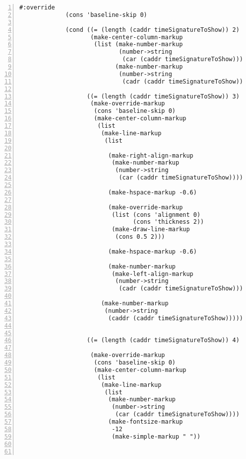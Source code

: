 \begin{Verbatim}[numbers=left,xleftmargin=5mm]
             #:override
             (cons 'baseline-skip 0)

             (cond ((= (length (caddr timeSignatureToShow)) 2)
                    (make-center-column-markup
                     (list (make-number-markup
                            (number->string
                             (car (caddr timeSignatureToShow))))
                           (make-number-markup
                            (number->string
                             (cadr (caddr timeSignatureToShow)))))))

                   ((= (length (caddr timeSignatureToShow)) 3)
                    (make-override-markup
                     (cons 'baseline-skip 0)
                     (make-center-column-markup
                      (list
                       (make-line-markup
                        (list

                         (make-right-align-markup
                          (make-number-markup
                           (number->string
                            (car (caddr timeSignatureToShow)))))

                         (make-hspace-markup -0.6)

                         (make-override-markup
                          (list (cons 'alignment 0)
                                (cons 'thickness 2))
                          (make-draw-line-markup
                           (cons 0.5 2)))

                         (make-hspace-markup -0.6)

                         (make-number-markup
                          (make-left-align-markup
                           (number->string
                            (cadr (caddr timeSignatureToShow)))))))

                       (make-number-markup
                        (number->string
                         (caddr (caddr timeSignatureToShow))))))))


                   ((= (length (caddr timeSignatureToShow)) 4)

                    (make-override-markup
                     (cons 'baseline-skip 0)
                     (make-center-column-markup
                      (list
                       (make-line-markup
                        (list
                         (make-number-markup
                          (number->string
                           (car (caddr timeSignatureToShow))))
                         (make-fontsize-markup
                          -12
                          (make-simple-markup " "))



\end{Verbatim}

